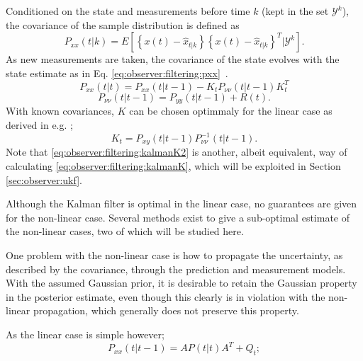     Conditioned on the state and measurements before time $k$ (kept in the set $\mathcal{Y}^{k}$), the
    covariance of the sample distribution is defined as
    \begin{equation}
        P_{xx}(t|k) = E \left[ \left\lbrace x(t) - \hat{x}_{t|k} \right\rbrace
                               \left\lbrace x(t) - \hat{x}_{t|k} \right\rbrace^{T}
                               | \mathcal{Y}^{k} \right] .
    \end{equation}
    As new measurements are taken, the covariance of the state evolves
    with the state estimate as in Eq. \eqref{eq:observer:filtering:pxx}~\citep{Julier95anewapproach}.
    \begin{equation}
        \label{eq:observer:filtering:pxx}
        P_{xx}(t|t) = P_{xx}(t|t-1) - K_{t}P_{\nu\nu}(t|t-1)K_{t}^{T}
    \end{equation}
    \begin{equation}
        \label{eq:observer:filtering:pnunu}
        P_{\nu\nu}(t|t-1) = P_{yy}(t|t-1) + R(t) .
    \end{equation}
    With known covariances, $K$ can be chosen optimmaly for the linear case as derived in e.g. \citep{gustafsson2010statistical};
    \begin{equation}
        \label{eq:observer:filtering:kalmanK2}
        K_{t} = P_{xy}(t|t-1)P_{\nu\nu}^{-1}(t|t-1).
    \end{equation}
    Note that \eqref{eq:observer:filtering:kalmanK2} is another, albeit equivalent,
    way of calculating \eqref{eq:observer:filtering:kalmanK}, which will be exploited
    in Section \ref{sec:observer:ukf}.

    Although the Kalman filter is optimal in the linear case, no guarantees are given for the non-linear case.
    Several methods exist to give a sub-optimal estimate of the non-linear cases,
    two of which will be studied here.

    One problem with the non-linear case is how to propagate the uncertainty,
    as described by the covariance, through the prediction and measurement models.
    With the assumed Gaussian prior, it is desirable to retain the Gaussian
    property in the posterior estimate, even though this clearly is in violation with the
    non-linear propagation, which generally does not preserve this property.

    As the linear case is simple however;
    \begin{equation}
        P_{xx}(t|t-1) = AP(t|t)A^{T} + Q_{t};
    \end{equation}

